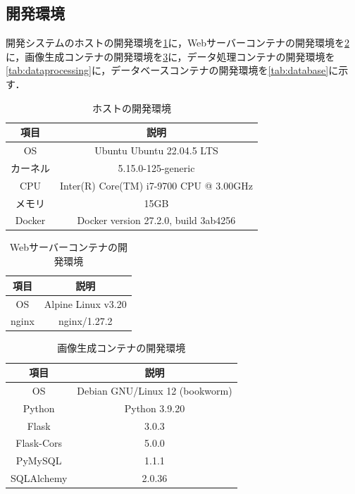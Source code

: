 \subsection{開発環境}
開発システムのホストの開発環境を\cref{tab:host}に，Webサーバーコンテナの開発環境を\cref{tab:webserver}に，画像生成コンテナの開発環境を\cref{tab:image}に，データ処理コンテナの開発環境を\cref{tab:dataprocessing}に，データベースコンテナの開発環境を\cref{tab:database}に示す．

\begin{table}
    \centering
    \caption{ホストの開発環境}
    \label{tab:host}
    \begin{tabular}{cc}
        \hline
        項目 & 説明 \\
        \hline \hline
        OS & Ubuntu Ubuntu 22.04.5 LTS \\
        カーネル & 5.15.0-125-generic \\
        CPU & Inter(R) Core(TM) i7-9700 CPU @ 3.00GHz \\
        メモリ & 15GB \\
        Docker & Docker version 27.2.0, build 3ab4256 \\
        \hline
    \end{tabular}
\end{table}

\begin{table}
    \centering
    \caption{Webサーバーコンテナの開発環境}
    \label{tab:webserver}
    \begin{tabular}{cc}
        \hline
        項目 & 説明 \\
        \hline \hline
        OS & Alpine Linux v3.20 \\
        \hline
        nginx & nginx/1.27.2 \\
        \hline
        \end{tabular}
\end{table}

\begin{table}
    \centering
    \caption{画像生成コンテナの開発環境}
    \label{tab:image}
    \begin{tabular}{cc}
        \hline
        項目 & 説明 \\
        \hline \hline
        OS & Debian GNU/Linux 12 (bookworm) \\
        \hline
        Python & Python 3.9.20 \\
        \hline
        Flask & 3.0.3 \\
        \hline
        Flask-Cors & 5.0.0 \\
        \hline
        PyMySQL & 1.1.1 \\
        \hline
        SQLAlchemy & 2.0.36 \\
        \hline
    \end{tabular}
\end{table}

